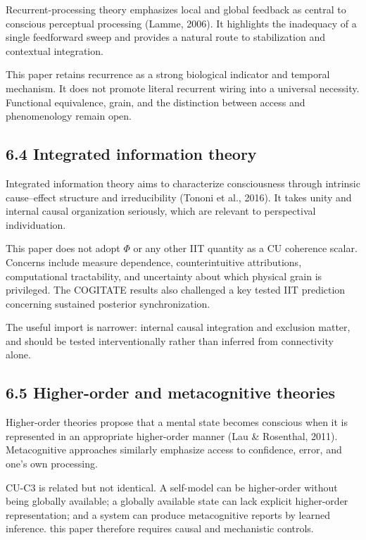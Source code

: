 \documentclass[
  11pt,
]{article}
\begin{document}
Recurrent-processing theory emphasizes local and global feedback as
central to conscious perceptual processing (Lamme, 2006). It highlights
the inadequacy of a single feedforward sweep and provides a natural
route to stabilization and contextual integration.

This paper retains recurrence as a strong biological indicator and
temporal mechanism. It does not promote literal recurrent wiring into a
universal necessity. Functional equivalence, grain, and the distinction
between access and phenomenology remain open.

\subsection{6.4 Integrated information
theory}\label{integrated-information-theory}

Integrated information theory aims to characterize consciousness through
intrinsic cause--effect structure and irreducibility (Tononi et al.,
2016). It takes unity and internal causal organization seriously, which
are relevant to perspectival individuation.

This paper does not adopt \(\Phi\) or any other IIT quantity as a CU
coherence scalar. Concerns include measure dependence, counterintuitive
attributions, computational tractability, and uncertainty about which
physical grain is privileged. The COGITATE results also challenged a key
tested IIT prediction concerning sustained posterior synchronization.

The useful import is narrower: internal causal integration and exclusion
matter, and should be tested interventionally rather than inferred from
connectivity alone.

\subsection{6.5 Higher-order and metacognitive
theories}\label{higher-order-and-metacognitive-theories}

Higher-order theories propose that a mental state becomes conscious when
it is represented in an appropriate higher-order manner (Lau \&
Rosenthal, 2011). Metacognitive approaches similarly emphasize access to
confidence, error, and one's own processing.

CU-C3 is related but not identical. A self-model can be higher-order
without being globally available; a globally available state can lack
explicit higher-order representation; and a system can produce
metacognitive reports by learned inference. this paper therefore
requires causal and mechanistic controls.
\end{document}
